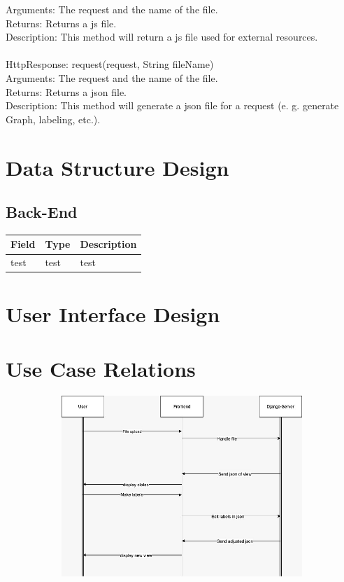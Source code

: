 \documentclass[12pt]{extarticle}
\begin{document}
    Arguments: The request and the name of the file. \\
	Returns: Returns a js file. \\
	Description: This method will return a js file used for external resources. \\ \\
	HttpResponse: request(request, String fileName) \\
    Arguments: The request and the name of the file. \\
	Returns: Returns a json file. \\
	Description: This method will generate a json file for a request (e. g. generate Graph, labeling, etc.). \\

\section{Data Structure Design}

\subsection{Back-End}

\begin{tabular}{ | l | l | l |}
    \hline
    Field & Type & Description \\ \hline
    test & test & test \\
    \hline
\end{tabular}

\section{User Interface Design}


\section{Use Case Relations}

\begin{figure}[H]
    \centering
    \begin{subfigure}[b]{0.85\textwidth}
        \includegraphics[width=\textwidth]{img1.jpeg}
        \label{fig:arc_1}
    \end{subfigure}
\end{figure}
\end{document}
